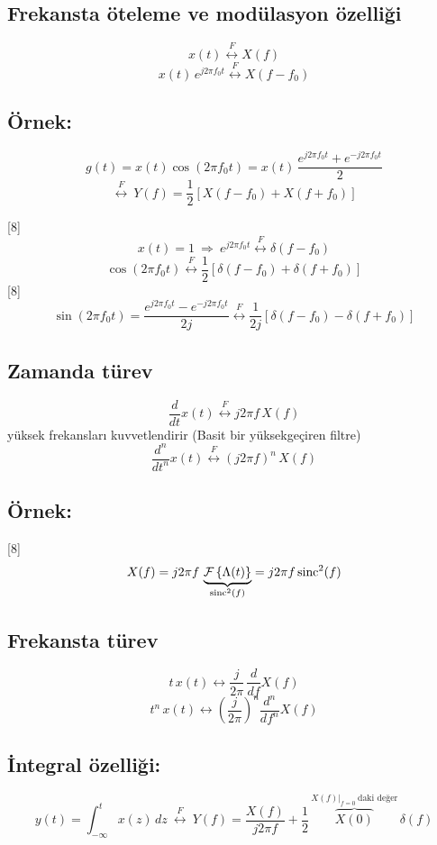 \documentclass[11pt,a4paper]{article}
\begin{document}
\subsection{Frekansta öteleme ve modülasyon özelliği}
\[ x(t)\overset{F}{\longleftrightarrow}X(f) \]
\[ x(t)\,e^{j2\pi f_0t}\overset{F}{\longleftrightarrow}X(f-f_0) \]
\subsection{Örnek:}
\[ g(t)=x(t)\cos(2\pi f_0t)=x(t)\,\frac{e^{j2\pi f_0t}+e^{-j2\pi f_0t}}{2} \]
\[ \overset{F}{\longleftrightarrow}\ Y(f)=\frac{1}{2}\left[X(f-f_0)+X(f+f_0)\right] \]

[8]
\[ x(t)=1\ \Rightarrow\ e^{j2\pi f_0t}\overset{F}{\longleftrightarrow}\delta(f-f_0) \]
\[ \cos(2\pi f_0t)\overset{F}{\longleftrightarrow}\frac{1}{2}\left[\delta(f-f_0)+\delta(f+f_0)\right] \]
[8]
\[ \sin(2\pi f_0t)=\frac{e^{j2\pi f_0t}-e^{-j2\pi f_0t}}{2j}\overset{F}{\longleftrightarrow}\frac{1}{2j}\left[\delta(f-f_0)-\delta(f+f_0)\right] \]

\subsection{Zamanda türev}
\[ \frac{d}{dt}x(t)\overset{F}{\longleftrightarrow}j2\pi f\,X(f) \]
yüksek frekansları kuvvetlendirir (Basit bir yüksekgeçiren filtre)
\[ \frac{d^n}{dt^n}x(t)\overset{F}{\longleftrightarrow}(j2\pi f)^n\,X(f) \]

\subsection{Örnek:}
[8]
\[ X(f)=j2\pi f\,\underbrace{\mathcal{F}\left\{\Lambda(t)\right\}}_{\mathrm{sinc}^2(f)}=j2\pi f\,\mathrm{sinc}^2(f) \]

\subsection{Frekansta türev}
\[ t\,x(t)\longleftrightarrow\frac{j}{2\pi}\,\frac{d}{df}X(f) \]
\[ t^n\,x(t)\longleftrightarrow\left(\frac{j}{2\pi}\right)^{n}\frac{d^n}{df^n}X(f) \]

\subsection{İntegral özelliği:}
\[ y(t)=\int_{-\infty}^{t}x(z)\,dz\ \overset{F}{\longleftrightarrow}\ Y(f)=\frac{X(f)}{j2\pi f}+\frac{1}{2}\,\overbrace{X(0)}^{X(f)|_{f=0}\ \text{daki değer}}\,\delta(f) \]
\end{document}
